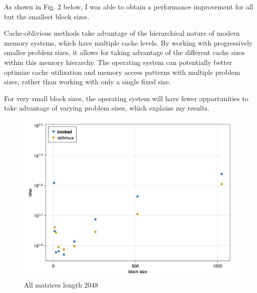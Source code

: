 \documentclass[twoside,10pt]{article}
\begin{document}
As shown in Fig. 2 below, I was able to obtain a performance improvement for all but the smallest block sizes.

Cache-oblivious methods take advantage of the hierarchical nature of modern memory systems, which have multiple cache levels.
By working with progressively smaller problem sizes, it allows for taking advantage of the different cache sizes within this memory hierarchy.
The operating system can potentially better optimize cache utilization and memory access patterns with multiple problem sizes, rather than working with only a single fixed size.

For very small block sizes, the operating system will have fewer opportunities to take advantage of varying problem sizes, which explains my results.

\begin{figure}[htb]
  \begin{center}
  \includegraphics[width=150mm]{HW2_code/performance_blocked_and_oblivious.jpg}
  \end{center}
  \caption{All matrices length 2048}
  \label{fig:figure2}
  \end{figure}
  
\end{document}
